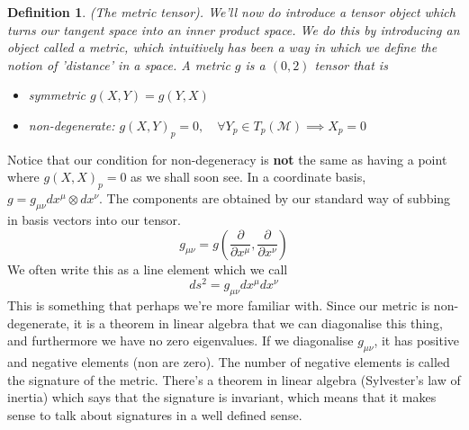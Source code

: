 \documentclass[11pt, a4paper]{article}   	%
\theoremstyle{slplain}
\newtheorem*{defn}{Definition}
\begin{document}
\begin{defn}{(The metric tensor). } 
We'll now do introduce a tensor object which 
turns our tangent space into an inner product space. 
We do this by introducing an object called a metric, 
which intuitively has been a way in which we define 
the notion of 'distance' in a space. 
A metric $ g $ is a $ ( 0, 2 ) $ tensor that is
\begin{itemize}
\item  symmetric $ g ( X, Y )  = g ( Y , X) $
\item non-degenerate: $ g ( X, Y )_ p = 0, \quad \forall Y_p \in T_p ( \mathcal{ M }) \implies X_p = 0$ 
\end{itemize}
\end{defn}
Notice that our condition for non-degeneracy is \textbf{not}
the same as having a point where  $ g ( X, X )_p = 0 $ as we
shall soon see. 
In a coordinate basis, $ g = g_{ \mu \nu } dx ^ \mu  \otimes dx^ \nu $.
The components are obtained by our standard way of 
subbing in basis vectors into our tensor. 
\[
	g _{\mu \nu  } = g \left( \frac{\partial }{\partial  x^ \mu } , \frac{\partial }{\partial x^ \nu } \right)  
\]  We often write this as 
a line element which we call 
\[
ds^ 2 = g_{ \mu \nu } dx^ \mu dx ^ \nu 
\] This is something that perhaps we're more 
familiar with. 
Since our metric is non-degenerate, it is 
a theorem in linear algebra that we can diagonalise this thing, and furthermore 
we have no zero eigenvalues. 
If we diagonalise $ g _{ \mu \nu }$, 
it has positive and negative elements (non are zero). 
The number of negative elements is called the 
signature of the metric. 
There's a theorem in linear algebra (Sylvester's law of inertia) 
which says that the signature is invariant, which means that 
it makes sense to talk about signatures in a well defined sense. 
\end{document}
